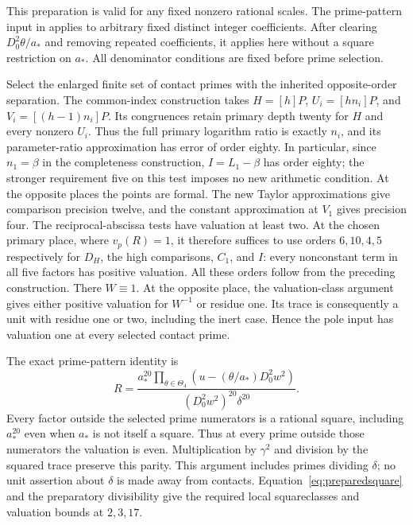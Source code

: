 \documentclass[11pt,a4paper]{article}
\begin{document}
This preparation is valid for any fixed nonzero rational scales.
The prime-pattern input in \cite{Selection,Dependencies} applies to
arbitrary fixed distinct integer coefficients. After clearing
$D_0^2\theta/a_*$ and removing repeated coefficients, it applies
here without a square restriction on $a_*$. All denominator
conditions are fixed before prime selection.

Select the enlarged finite set of contact primes with the inherited
opposite-order separation. The common-index construction takes $H=[h]P$,
$U_i=[hn_i]P$, and $V_i=[(h-1)n_i]P$. Its congruences retain primary
depth twenty for $H$ and every nonzero $U_i$. Thus the full primary
logarithm ratio is exactly $n_i$, and its parameter-ratio approximation
has error of order eighty. In particular, since $n_1=\beta$ in the
completeness construction, $I=L_1-\beta$ has order eighty; the stronger
requirement five on this test imposes no new arithmetic condition. At the opposite places the points are formal. The new
Taylor approximations give comparison precision twelve, and the
constant approximation at $V_1$ gives precision four. The reciprocal-abscissa tests have valuation at least two. At the
chosen primary place, where $v_p(R)=1$, it therefore suffices to use
orders $6,10,4,5$ respectively for $D_H$, the high comparisons,
$C_1$, and $I$: every nonconstant term in all five factors has
positive valuation. All these orders follow from the preceding
construction. There $W\equiv1$. At the opposite
place, the valuation-class argument gives either positive valuation
for $W^{-1}$ or residue one. Its trace is consequently a unit with
residue one or two, including the inert case. Hence the pole input
has valuation one at every selected contact prime.

The exact prime-pattern identity is
\[
 R=\frac{\displaystyle a_*^{20}\prod_{\theta\in\Theta_4}
          (u-(\theta/a_*)D_0^2w^2)}
        {(D_0^2w^2)^{20}\delta^{20}}.
\]
Every factor outside the selected prime numerators is a rational
square, including $a_*^{20}$ even when $a_*$ is not itself a square.
Thus at every prime outside those numerators the valuation is even. Multiplication by $\gamma^2$ and division by the squared trace preserve this parity. This argument includes primes dividing $\delta$;
no unit assertion about $\delta$ is made away from contacts.
Equation~\eqref{eq:preparedsquare} and the preparatory divisibility
give the required local squareclasses and valuation bounds at $2,3,17$.
\end{document}
